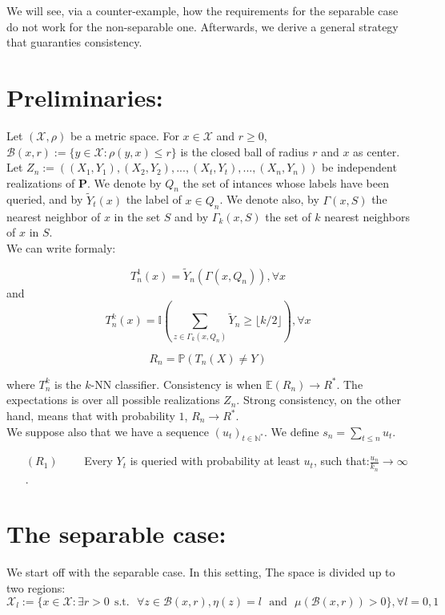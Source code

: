 \documentclass[onecolumn,12pt]{article}
\begin{document}
We will see, via a counter-example, how the requirements for the separable case do not work for the non-separable one. Afterwards, we derive a general strategy that guaranties consistency.

\section{Preliminaries:}

Let $(\mathscr{X},\rho)$ be a metric space. For $x \in \mathscr{X}$ and $r \geq 0$, $\mathscr{B}(x,r):=\{y \in \mathscr{X}: \rho(y,x) \leq r \}$ is the closed ball of radius $r$ and $x$ as center.\\

Let $Z_n:=((X_1,Y_1), (X_2,Y_2), ... ,(X_t,Y_t), ... ,(X_n,Y_n))$ be independent realizations of \textbf{P}. We denote by $Q_n$ the set of intances whose labels have been queried, and by $\tilde{Y}_t(x)$ the label of $x \in Q_n$. We denote also, by $\Gamma(x,S)$ the nearest neighbor of $x$ in the set $S$ and by $\Gamma_k(x,S)$ the set of $k$ nearest neighbors of $x$ in $S$.\\

We can write formaly:

$$T_n^1(x)=\tilde{Y}_n(\Gamma(x,Q_n)), \forall x $$
and
$$T_n^k(x)=\mathbb{I}(\sum_{z \in \Gamma_k(x,Q_n)} \tilde{Y}_n \geq \lfloor k/2 \rfloor), \forall x$$

$$R_n=\mathbb{P}(T_n(X) \neq Y)$$

where $T_n^k$ is the $k$-NN classifier. Consistency is when $\mathbb{E}(R_n) \rightarrow R^*$. The expectations is over all possible realizations $Z_n$. Strong consistency, on the other hand, means that with probability $1$, $R_n \rightarrow R^*$.\\

We suppose also that we have a sequence $(u_t)_{t \in \mathbb{N}^*}$. We define $s_n=\sum_{t \leq n} u_t$.

\begin{itemize}
\item[$(R_1)$] \ \ \ \ Every $Y_t$ is queried with probability at least $u_t$, such that:$\frac{u_n}{k_n} \rightarrow \infty$.
\end{itemize}

\section{The separable case:}

We start off with the separable case. In this setting, The space is divided up to two regions: $$\mathscr{X}_l:=\{x \in \mathscr{X} : \exists r>0 \ \  \text{s.t.} \ \  \ \forall z \in \mathscr{B}(x,r), \eta(z)=l \  \  \ \text{and}  \ \ \ \mu(\mathscr{B}(x,r))>0\},\forall l=0,1$$
\end{document}
